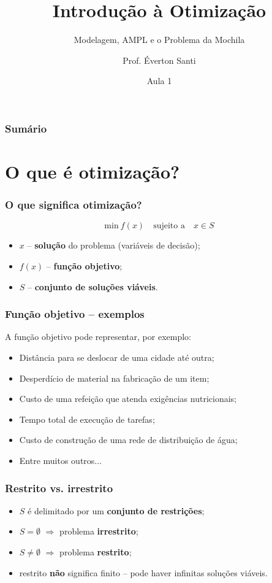 \documentclass[fleqn]{beamer}
\title[Aula 1 -- Introdução à Otimização]{Introdução à Otimização}
\subtitle{Modelagem, AMPL e o Problema da Mochila}
\author[Santi]{Prof. \'Everton Santi}
\institute[UFRN/ECT]{ECT2524 -- Introdução à Otimização \\ Escola de Ciências e Tecnologia -- UFRN}
\date{Aula 1}
\begin{document}
\begin{frame}
	\titlepage
\end{frame}

\begin{frame}
	\frametitle{Sumário}
	\tableofcontents
\end{frame}

\section{O que é otimização?}

\begin{frame}
	\frametitle{O que significa otimização?}
	$$
		\text{min}~f(x) \quad \text{sujeito a} \quad x \in S
	$$
	\begin{itemize}
		\item $x$ -- \textbf{solução} do problema (variáveis de decisão);
		\item $f(x)$ -- \textbf{função objetivo};
		\item $S$ -- \textbf{conjunto de soluções viáveis}.
	\end{itemize}
\end{frame}

\begin{frame}
	\frametitle{Função objetivo -- exemplos}
	A função objetivo pode representar, por exemplo:
	\begin{itemize}
		\item Distância para se deslocar de uma cidade até outra;
		\item Desperdício de material na fabricação de um item;
		\item Custo de uma refeição que atenda exigências nutricionais;
		\item Tempo total de execução de tarefas;
		\item Custo de construção de uma rede de distribuição de água;
		\item Entre muitos outros...
	\end{itemize}
\end{frame}

\begin{frame}
	\frametitle{Restrito vs. irrestrito}
	\begin{itemize}
		\item $S$ é delimitado por um \textbf{conjunto de restrições};
		\item $S = \emptyset$ $\Rightarrow$ problema \textbf{irrestrito};
		\item $S \neq \emptyset$ $\Rightarrow$ problema \textbf{restrito};
		\item restrito \textbf{não} significa finito -- pode haver infinitas
			soluções viáveis.
	\end{itemize}
\end{frame}
\end{document}
